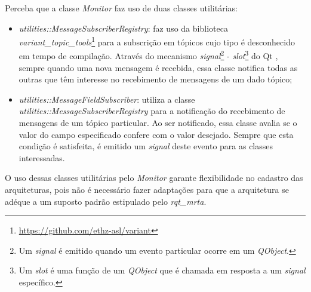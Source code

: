         Perceba que a classe \textit{Monitor} faz uso de duas classes utilitárias:
        
        \begin{itemize}
            \item \textit{utilities::MessageSubscriberRegistry}: faz uso da biblioteca \textit{variant\_topic\_tools}\footnote{\url{https://github.com/ethz-asl/variant}} para a subscrição em tópicos cujo tipo é desconhecido em tempo de compilação.  Através do mecanismo \textit{signal}\footnote{Um \textit{signal} é emitido quando um evento particular ocorre em um \textit{QObject}.} - \textit{slot}\footnote{Um \textit{slot} é uma função de um \textit{QObject} que é chamada em resposta a um \textit{signal} específico.} do Qt \cite{ref:yafei2012qt}, sempre quando uma nova mensagem é recebida, essa classe notifica todas as outras que têm interesse no recebimento de mensagens de um dado tópico;
            
            \item \textit{utilities::MessageFieldSubscriber}: utiliza a classe \textit{utilities::MessageSubscriberRegistry} para a notificação do recebimento de mensagens de um tópico particular. Ao ser notificado, essa classe avalia se o valor do campo especificado confere com o valor desejado. Sempre que esta condição é satisfeita, é emitido um \textit{signal} deste evento para as classes interessadas.
        \end{itemize}
         
        O uso dessas classes utilitárias pelo \textit{Monitor} garante flexibilidade no cadastro das arquiteturas, pois não é necessário fazer adaptações para que a arquitetura se adéque a um suposto padrão estipulado pelo \textit{rqt\_mrta}.
    